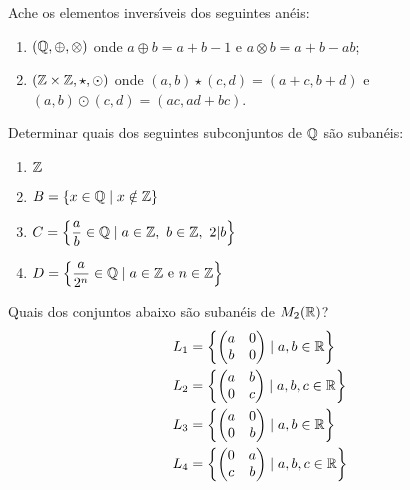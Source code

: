 \documentclass[12pt]{article}
\begin{document}
\vesp



\questao Ache os elementos invers{\'\i}veis dos seguintes an\'eis:
\begin{enumerate}[label={\alph*})]
	\item $(\mathbb{Q}, \oplus, \otimes)$ onde $a \oplus b = a + b - 1$ e $a \otimes b = a + b - ab$;
	\item $(\mathbb{Z} \times \mathbb{Z}, \star, \odot)$ onde $(a, b) \star (c, d) = (a + c, b + d)$ e $(a, b) \odot (c, d) = (ac, ad + bc)$.
\end{enumerate}

\vesp

\questao Determinar quais dos seguintes subconjuntos de $\mathbb{Q}$ s{\~a}o suban{\'e}is:
	\begin{multicols}{2}
		\begin{enumerate}[label=({\alph*})]
			\item $\mathbb{Z}$
			\item $B = \{x \in \mathbb{Q} \mid x \notin \mathbb{Z}\}$
			\item $C = \left\{\dfrac{a}{b} \in \mathbb{Q} \mid a \in \mathbb{Z},\ b \in \mathbb{Z},\ 2 |b \right\}$
			\item $D = \left\{\dfrac{a}{2^n} \in \mathbb{Q} \mid a \in \mathbb{Z} \mbox{ e } n \in \mathbb{Z} \right\}$
		\end{enumerate}
	\end{multicols}

\vesp

\questao Quais dos conjuntos abaixo s\~ao suban\'eis de $M_2(\mathbb{R})$?
\begin{align*}
	L_1 &= \left\{\begin{pmatrix}
		a & 0\\
		b & 0
	\end{pmatrix} \mid a, b \in \mathbb{R}\right\}\\
	L_2 &= \left\{\begin{pmatrix}
		a & b\\
		0 & c
	\end{pmatrix} \mid a, b, c \in \mathbb{R}\right\}\\
	L_3 &= \left\{\begin{pmatrix}
		a & 0\\
		0 & b
	\end{pmatrix} \mid a, b \in \mathbb{R}\right\}\\
	L_4 &= \left\{\begin{pmatrix}
		0 & a\\
		c & b
	\end{pmatrix} \mid a, b, c \in \mathbb{R}\right\}
\end{align*}
\end{document}
